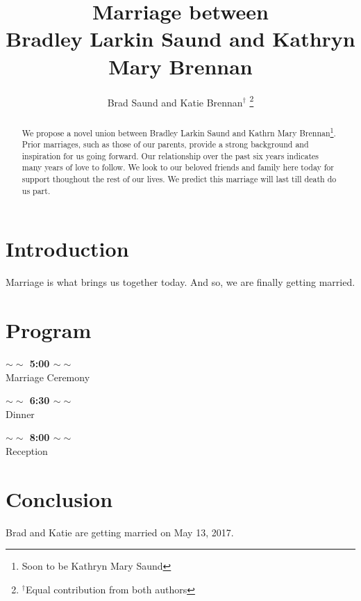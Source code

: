 \documentclass[letterpaper, 10 pt, conference]{ieeeconf}
\title{\LARGE \bf
  Marriage between \\
  Bradley Larkin Saund and Kathryn Mary Brennan
}
\author{Brad Saund and Katie Brennan$^{\dagger}$
\thanks{${^\dagger}$Equal contribution from both authors}%
}
\newcommand{\programSpace}{\vspace{0.2in}}
\newcommand{\programTime}[1]{\textbf{$\sim\sim$ #1 $\sim\sim$}}
\begin{document}
\maketitle
\thispagestyle{empty}
\pagestyle{empty}


\begin{abstract}
  We propose a novel union between Bradley Larkin Saund and Kathrn Mary Brennan\footnote{Soon to be Kathryn Mary Saund}.
  Prior marriages, such as those of our parents, provide a strong background and inspiration for us going forward.
  Our relationship over the past six years indicates many years of love to follow.
  We look to our beloved friends and family here today for support thoughout the rest of our lives.
  We predict this marriage will last till death do us part.
  
\end{abstract}


\section{Introduction}
Marriage is what brings us together today\cite{PrincessBride}.
And so, we are finally getting married\cite{AladdinKoT}.

\vspace{5.5in}

\section{Program}
\programSpace
\begin{center}
  \programTime{5:00}\\
  Marriage Ceremony\\
  \programSpace

  \programTime{6:30}\\
  Dinner\\
  \programSpace

  \programTime{8:00}\\
  Reception

  \programSpace
  
\end{center}
\section{Conclusion}
Brad and Katie are getting married on May 13, 2017.



\end{document}
